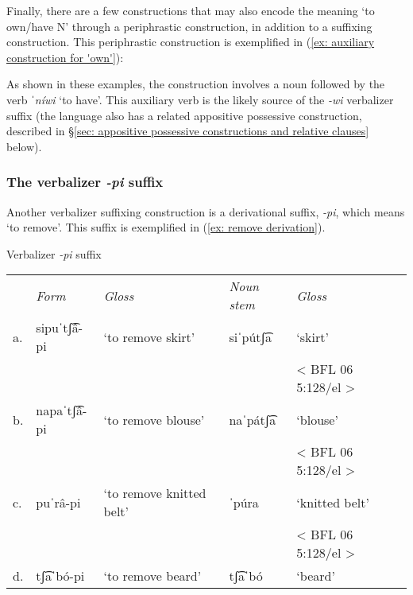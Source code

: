 Finally, there are a few constructions that may also encode the meaning `to own/have N' through a periphrastic construction, in addition to a suffixing construction. This periphrastic construction is exemplified in (\ref{ex: auxiliary construction for 'own'}):

\ea\label{ex: auxiliary construction for 'own'}

    \z
\z

As shown in these examples, the construction involves a noun followed by the verb \textit{ˈníwi} ‘to have’. This auxiliary verb is the likely source of the \textit{-wi} verbalizer suffix (the language also has a related appositive possessive construction, described in §\ref{sec: appositive possessive constructions and relative clauses} below).

\subsubsection{The verbalizer \textit{-pi} suffix}
\label{subsubsec: the verbalizer -pi suffix}

Another verbalizer suffixing construction is a derivational suffix, \textit{-pi}, which means `to remove'. This suffix is exemplified in (\ref{ex: remove derivation}).

\ea\label{ex: remove derivation}
{Verbalizer \textit{-pi} suffix}
\setlength{\tabcolsep}{3pt}
\begin{tabular}{lllll}
      & \textit{Form} & \textit{Gloss} & \textit{Noun stem} & \textit{Gloss} \\
    a.& sipuˈtʃ͡â-pi&{‘to remove skirt’}&{siˈpútʃ͡a}& {‘skirt'}\\
    & & & & {< BFL 06 5:128/el >}\\
    b.&{napaˈtʃ͡â-pi}&{‘to remove blouse'}&{naˈpátʃ͡a}& {‘blouse'}\\
     & & & & {< BFL 06 5:128/el >}\\
    c.&{puˈrâ-pi}&{‘to remove knitted belt’}&{ˈpúra}& {‘knitted belt’}\\
      & & & &{< BFL 06 5:128/el >}\\
    d.&{tʃ͡aˈbó-pi}&{‘to remove beard'}&{tʃ͡aˈbó}& {‘beard’}\\
\end{tabular}
    \z

